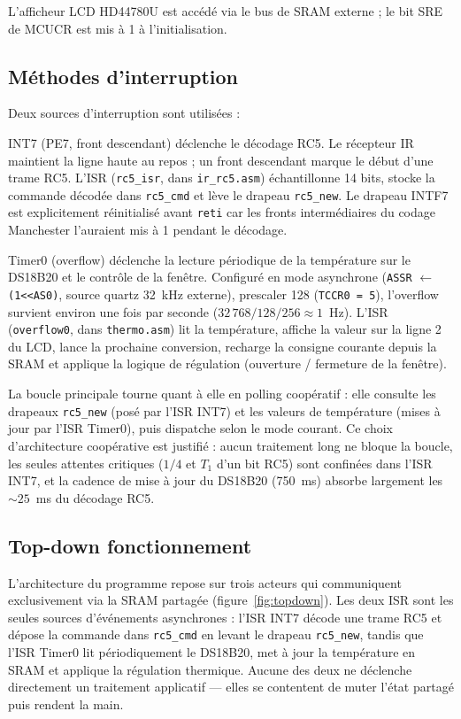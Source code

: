 \documentclass[11pt]{article}
\begin{document}
L'afficheur LCD HD44780U est accédé via le bus de SRAM externe ; le bit SRE de MCUCR est mis à 1 à l'initialisation.

\subsection{Méthodes d'interruption}

Deux sources d'interruption sont utilisées :

INT7 (PE7, front descendant) déclenche le décodage RC5. Le récepteur IR maintient la ligne haute au repos ; un front descendant marque le début d'une trame RC5. L'ISR (\texttt{rc5\_isr}, dans \texttt{ir\_rc5.asm}) échantillonne 14 bits, stocke la commande décodée dans \texttt{rc5\_cmd} et lève le drapeau \texttt{rc5\_new}. Le drapeau INTF7 est explicitement réinitialisé avant \texttt{reti} car les fronts intermédiaires du codage Manchester l'auraient mis à 1 pendant le décodage.

Timer0 (overflow) déclenche la lecture périodique de la température sur le DS18B20 et le contrôle de la fenêtre. Configuré en mode asynchrone (\texttt{ASSR} $\leftarrow$ \texttt{(1{<}{<}AS0)}, source quartz 32~kHz externe), prescaler 128 (\texttt{TCCR0 = 5}), l'overflow survient environ une fois par seconde ($32\,768 / 128 / 256 \approx 1$~Hz). L'ISR (\texttt{overflow0}, dans \texttt{thermo.asm}) lit la température, affiche la valeur sur la ligne 2 du LCD, lance la prochaine conversion, recharge la consigne courante depuis la SRAM et applique la logique de régulation (ouverture / fermeture de la fenêtre).

La boucle principale tourne quant à elle en polling coopératif : elle consulte les drapeaux \texttt{rc5\_new} (posé par l'ISR INT7) et les valeurs de température (mises à jour par l'ISR Timer0), puis dispatche selon le mode courant. Ce choix d'architecture coopérative est justifié : aucun traitement long ne bloque la boucle, les seules attentes critiques ($1/4$ et $T_1$ d'un bit RC5) sont confinées dans l'ISR INT7, et la cadence de mise à jour du DS18B20 (750~ms) absorbe largement les ${\sim}25$~ms du décodage RC5.


\subsection{Top-down fonctionnement}

L'architecture du programme repose sur trois acteurs qui communiquent exclusivement via la SRAM partagée (figure~\ref{fig:topdown}). Les deux ISR sont les seules sources d'événements asynchrones : l'ISR INT7 décode une trame RC5 et dépose la commande dans \texttt{rc5\_cmd} en levant le drapeau \texttt{rc5\_new}, tandis que l'ISR Timer0 lit périodiquement le DS18B20, met à jour la température en SRAM et applique la régulation thermique. Aucune des deux ne déclenche directement un traitement applicatif --- elles se contentent de muter l'état partagé puis rendent la main.
\end{document}
